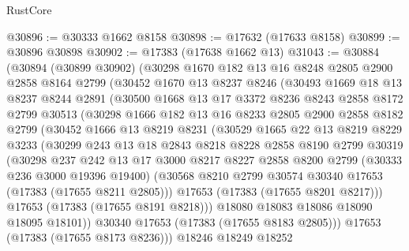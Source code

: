 \begin{lexlean}{RustCore}
\begin{coremodule}
@30896 := @30333 @1662 @8158
@30898 := @17632 (@17633 @8158)
@30899 := @30896 @30898
@30902 := @17383 (@17638 @1662 @13)
@31043 := @30884
    (@30894
      (@30899 @30902)
      (@30298
        @1670
        @182
        @13
        @16
        @8248
        @2805
        @2900
        @2858
        @8164
        @2799
        (@30452
          @1670
          @13
          @8237
          @8246
          (@30493
            @1669
            @18
            @13
            @8237
            @8244
            @2891
            (@30500
              @1668
              @13
              @17
              @3372
              @8236
              @8243
              @2858
              @8172
              @2799
              @30513
              (@30298
                @1666
                @182
                @13
                @16
                @8233
                @2805
                @2900
                @2858
                @8182
                @2799
                (@30452
                  @1666
                  @13
                  @8219
                  @8231
                  (@30529
                    @1665
                    @22
                    @13
                    @8219
                    @8229
                    @3233
                    (@30299
                      @243
                      @13
                      @18
                      @2843
                      @8218
                      @8228
                      @2858
                      @8190
                      @2799
                      @30319
                      (@30298
                        @237
                        @242
                        @13
                        @17
                        @3000
                        @8217
                        @8227
                        @2858
                        @8200
                        @2799
                        (@30333 @236 @3000 @19396 @19400)
                        (@30568 @8210 @2799 @30574 @30340 @17653 (@17383 (@17655 @8211 @2805)))
                        @17653
                        (@17383 (@17655 @8201 @8217)))
                      @17653
                      (@17383 (@17655 @8191 @8218)))
                    @18080
                    @18083
                    @18086
                    @18090
                    @18095
                    @18101))
                @30340
                @17653
                (@17383 (@17655 @8183 @2805)))
              @17653
              (@17383 (@17655 @8173 @8236)))
            @18246
            @18249
            @18252

\end{coremodule}
\end{lexlean}
